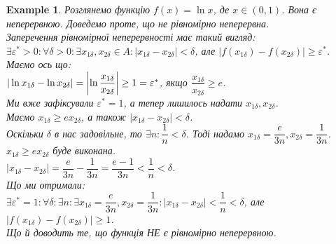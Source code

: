\documentclass[a4paper, 14pt]{article}
\theoremstyle{theoremdd}
\theoremstyle{theoremdd}
\theoremstyle{theoremdd}
\theoremstyle{theoremdd}
\newtheorem{example}[theorem]{Example}
\theoremstyle{theoremdd}
\theoremstyle{theoremdd}
\theoremstyle{theoremdd}
\theoremstyle{theoremdd}
\begin{document}
\begin{example}
Розглянемо функцію $f(x) = \ln x$, де $x \in (0,1)$. Вона є неперервною. Доведемо проте, що не рівномірно неперервна.\\
Заперечення рівномірної неперервності має такий вигляд:\\
$\exists \varepsilon^* > 0: \forall \delta > 0: \exists x_{1 \delta},x_{2 \delta} \in A: |x_{1 \delta}-x_{2 \delta}|<\delta$, але $|f(x_{1 \delta}) - f(x_{2 \delta})| \geq \varepsilon^*$.\\
Маємо ось що:\\
$|\ln x_{1 \delta} - \ln x_{2 \delta}| = \abs{\ln \dfrac{x_{1 \delta}}{x_{2 \delta}}} \geq 1 = \varepsilon^*$, якщо $\dfrac{x_{1 \delta}}{x_{2 \delta}} \geq e$.\\
Ми вже зафіксували $\varepsilon^* = 1$, а тепер лишилось надати $x_{1 \delta}, x_{2 \delta}$.\\
Маємо $x_{1 \delta} \geq e x_{2 \delta}$, а також $|x_{1 \delta} - x_{2 \delta}| < \delta$.\\
Оскільки $\delta$ в нас задовільне, то $\exists n: \dfrac{1}{n} < \delta$. Тоді надамо $x_{1 \delta} = \dfrac{e}{3n}, x_{2 \delta} = \dfrac{1}{3n}$.
$x_{1 \delta} \geq e x_{2 \delta}$ буде виконана.\\
$|x_{1 \delta} - x_{2 \delta}| = \dfrac{e}{3n} - \dfrac{1}{3n} = \dfrac{e-1}{3n} < \dfrac{1}{n} < \delta$.\\
Що ми отримали:\\
$\exists \varepsilon^* = 1: \forall \delta: \exists n: \exists x_{1 \delta} = \dfrac{e}{3n}, x_{2 \delta} = \dfrac{1}{3n}: |x_{1 \delta} - x_{2 \delta}| < \dfrac{1}{n} < \delta$, але $|f(x_{1\delta}) - f(x_{2 \delta})| \geq 1$.\\
Що й доводить те, що функція НЕ є рівномірно неперервною.
\begin{figure}[H]
\centering
{}
\end{figure}
\end{example}
\end{document}
